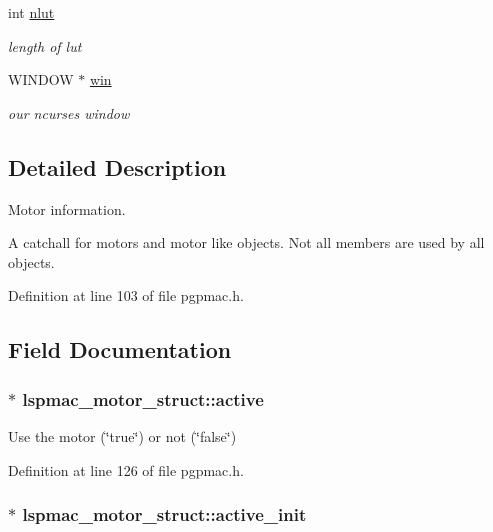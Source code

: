 \begin{DoxyCompactItemize}
int \hyperlink{structlspmac__motor__struct_a11cbc6f50c150ed446e9a901cf7cc12b}{nlut}
\begin{DoxyCompactList}\small\item\em length of lut \end{DoxyCompactList}\item 
W\-I\-N\-D\-O\-W $\ast$ \hyperlink{structlspmac__motor__struct_a133775154b0e008f3a2fde6f53bc0eff}{win}
\begin{DoxyCompactList}\small\item\em our ncurses window \end{DoxyCompactList}\end{DoxyCompactItemize}


\subsection{Detailed Description}
Motor information. 

A catchall for motors and motor like objects. Not all members are used by all objects. 

Definition at line 103 of file pgpmac.\-h.



\subsection{Field Documentation}
\hypertarget{structlspmac__motor__struct_aed4998885bcd5a2a30069637180f58e3}{
\subsubsection[{active}]{$\ast$ lspmac\-\_\-motor\-\_\-struct\-::active}}\label{structlspmac__motor__struct_aed4998885bcd5a2a30069637180f58e3}


Use the motor (\char`\"{}true\char`\"{}) or not (\char`\"{}false\char`\"{}) 



Definition at line 126 of file pgpmac.\-h.

\hypertarget{structlspmac__motor__struct_ac2a02f137e4a35db816bc728290d3558}{
\subsubsection[{active\-\_\-init}]{$\ast$ lspmac\-\_\-motor\-\_\-struct\-::active\-\_\-init}}\label{structlspmac__motor__struct_ac2a02f137e4a35db816bc728290d3558}


